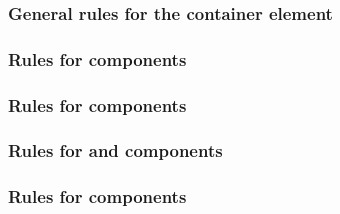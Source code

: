 \begin{sbmlenum}

\end{sbmlenum} \subsubsection*{General rules for the  container element} \begin{sbmlenum}


\end{sbmlenum} \subsubsection*{Rules for  components} \begin{sbmlenum}


\end{sbmlenum} \subsubsection*{Rules for  components} \begin{sbmlenum}


\end{sbmlenum} \subsubsection*{Rules for  and  components} \begin{sbmlenum}


\end{sbmlenum} \subsubsection*{Rules for  components} \begin{sbmlenum}


\end{sbmlenum}
